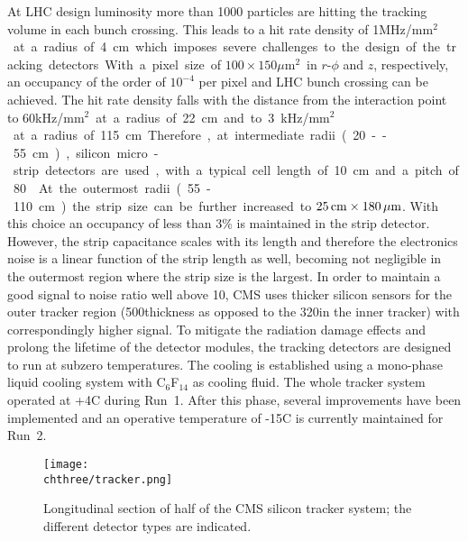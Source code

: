 At LHC design luminosity more than 1000 particles are hitting the tracking volume in each bunch crossing. This leads to a hit rate density of 1\unit{MHz/mm$^2$} at a radius of 4\cm which imposes severe challenges to the design of the tracking detectors. With a pixel size of $100\times150$\unit{$\mu\mathrm{m}^2$} in $r$-$\phi$ and $z$, respectively, an occupancy of the order of $10^{-4}$ per pixel and LHC bunch crossing can be achieved. The hit rate density falls with the distance from the interaction point to 60\unit{kHz/mm$^2$} at a radius of 22\cm and to 3\unit{kHz/mm$^2$} at a radius of 115\cm. Therefore, at intermediate radii (20--55\cm), silicon micro-strip detectors are used, with a typical cell length of 10\cm and a pitch of 80\mum. At the outermost radii (55-110\cm)
the strip size can be further increased to $25\,\text{cm}\times180\,\mu\text{m}$. With this choice an occupancy of less than 3\% is maintained in the strip detector.
However, the strip capacitance scales with its length and therefore the electronics noise is a linear function of the strip length as well, becoming not negligible in the outermost region where the strip size is the largest. In order to maintain a good signal to noise ratio well above 10, CMS uses thicker silicon sensors for the outer tracker region (500\mum thickness as opposed to the 320\mum in the inner tracker) with correspondingly higher signal. To mitigate the radiation damage effects and prolong the lifetime of the detector modules, the tracking detectors are designed to run at subzero temperatures. The cooling is established using a mono-phase liquid cooling system with C$_6$F$_{14}$ as cooling fluid. The whole tracker system operated at +4\de\unit{C} during Run~1. After this phase, several improvements have been implemented and an operative temperature of -15\de\unit{C} is currently maintained for Run~2.\\

\begin{figure}[!htb]
 \begin{center}
  \texttt{[image: \\chthree/tracker.png]}
 \end{center}
 \caption{Longitudinal section of half of the CMS silicon tracker system; the different detector types are indicated.}
 \label{fig:TrackerLayout}
\end{figure}

